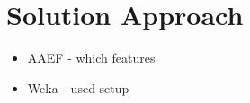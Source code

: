 \section{Solution Approach}

\begin{itemize}
    \item AAEF - which features
	\item Weka - used setup
\end{itemize}



